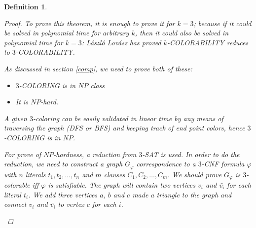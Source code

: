 \documentclass[12pt]{article}
\theoremstyle{slplain}
\newtheorem{defi}{Definition}
\begin{document}
\begin{defi}
\begin{proof}
To prove this theorem, it is enough to prove it for $k = 3$; because if it could be solved in polynomial time for arbitrary $k$, then it could also be solved in polynomial time for $k=3$: L\'aszl\'o Lov\'asz has proved $k$-COLORABILITY reduces to $3$-COLORABILITY. \cite{Laszlo}

As discussed in section \ref{comp}, we need to prove both of these:
\begin{itemize}
\item $3$-COLORING is in $NP$ class
\item It is $NP$-hard. 
\end{itemize}

A given $3$-coloring can be easily validated in linear time by any means of traversing the graph (DFS or BFS) and keeping track of end point colors, hence $3$-COLORING is in $NP$.  

For prove of $NP$-hardness, a reduction from $3$-SAT \cite{karp} is used. In order to do the reduction, we need to construct a graph $G_\varphi$ correspondence to a $3$-CNF formula $\varphi$ with $n$ literals $t_1, t_2,\dots, t_n$ and $m$ clauses $C_1, C_2, \dots, C_m$. We should prove $G_\varphi$ is $3$-colorable iff $\varphi$ is satisfiable. The graph will contain two vertices $v_i$ and $\bar{v_i}$ for each literal $t_i$. We add three vertices $a$, $b$ and $c$ made a triangle to the graph and connect $v_i$ and $\bar{v_i}$ to vertex $c$ for each $i$. 



\begin{center}
\end{center}
\end{proof}
\end{defi}
\end{document}

